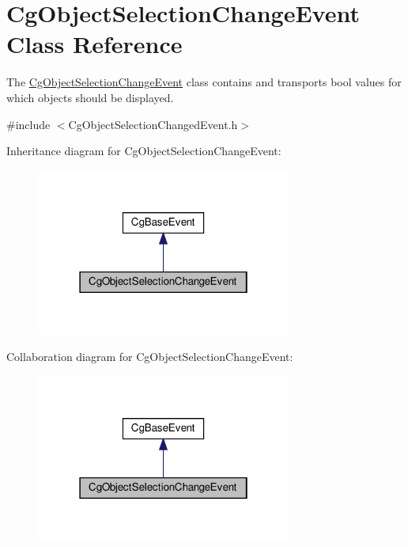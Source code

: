 \hypertarget{class_cg_object_selection_change_event}{}\section{Cg\+Object\+Selection\+Change\+Event Class Reference}
\label{class_cg_object_selection_change_event}


The \hyperlink{class_cg_object_selection_change_event}{Cg\+Object\+Selection\+Change\+Event} class contains and transports bool values for which objects should be displayed.  




{\ttfamily \#include $<$Cg\+Object\+Selection\+Changed\+Event.\+h$>$}



Inheritance diagram for Cg\+Object\+Selection\+Change\+Event\+:
\nopagebreak
\begin{figure}[H]
\begin{center}
\leavevmode
\includegraphics[width=238pt]{class_cg_object_selection_change_event__inherit__graph}
\end{center}
\end{figure}


Collaboration diagram for Cg\+Object\+Selection\+Change\+Event\+:
\nopagebreak
\begin{figure}[H]
\begin{center}
\leavevmode
\includegraphics[width=238pt]{class_cg_object_selection_change_event__coll__graph}
\end{center}
\end{figure}

